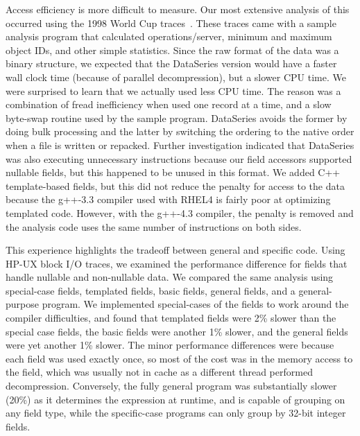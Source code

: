 \documentclass{acm_proc_article-sp}
\begin{document}
Access efficiency 
is more difficult to measure.  Our most
extensive analysis of this occurred using the 1998 World Cup
traces~\cite{ita-wcweb98}.  These traces came with a sample analysis
program that calculated operations/server, minimum and maximum object
IDs, and other simple statistics.  Since the raw format of the data
was a binary structure, we expected that the DataSeries version would
have a faster wall clock time (because of parallel decompression), but
a slower CPU time.  We were surprised to learn that we actually used
less CPU time.  The reason 
was a combination of fread
inefficiency when used one record at a time, and a slow byte-swap
routine used by the sample program.  DataSeries avoids the former by
doing bulk processing and the latter by switching the ordering to the
native order when a file is written or repacked.  Further
investigation indicated that DataSeries was also executing unnecessary
instructions because our field accessors supported nullable fields,
but this happened to be unused in this format.  We added C++ 
template-based fields, 
but this did not reduce the penalty for access to the
data because the g++-3.3 compiler used with RHEL4 is fairly poor at
optimizing templated code.  However, with the g++-4.3 compiler, the
penalty is removed and the analysis code uses the same number of 
instructions on both sides.

This experience highlights the tradeoff between general and specific
code.  
Using HP-UX block I/O traces,
we examined the performance difference for fields
that handle nullable and non-nullable data. 
We
compared the same analysis using special-case fields, templated
fields, basic fields, general fields, and a general-purpose program.  We
implemented special-cases of the fields to work around the compiler
difficulties, and found that templated fields were 2\% slower than the
special case fields, the basic fields were another 1\% slower, and the
general fields were yet another 1\% slower.  The 
minor
performance differences
were because each field was used
exactly once, so most of the cost was in the memory access to the
field, which was usually not in cache as a different thread performed
decompression.  Conversely, the fully general program was
substantially slower (20\%) as it determines the expression at
runtime, and is capable of grouping on any field type, while the
specific-case programs can only group by 32-bit integer fields.  
\end{document}
